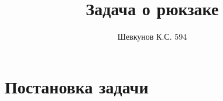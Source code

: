 \documentclass{article}
\title{Задача о рюкзаке}
\author{Шевкунов К.С. 594}
\begin{document}
\maketitle

\begin{comment}
\section{Постановка задачи}
	\subsection{Формулировка условия}
	\subsection{Цель}
	\subsection{Доказательство NP-полноты}

\section{Псевдополиномиальное решение}
	\subsection{Алгоритм}
	\subsection{Доказательство}
		 
\section{Полиномиальное приближение}
	\subsection{Алгоритм}
	\subsection{Доказательство}
	\subsection{Работа на реальных данных}
\end{comment}



\section{Постановка задачи}
\end{document}
